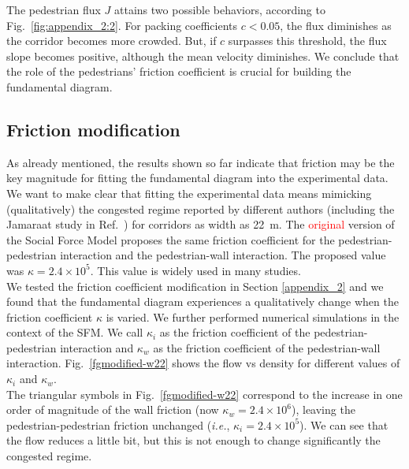 \documentclass[preprint,12pt]{elsarticle}
\begin{document}
The pedestrian flux $J$ attains two possible behaviors, according to 
Fig.~\ref{fig:appendix_2:2}. For packing coefficients $c<0.05$, the flux 
diminishes as the corridor becomes more crowded. But, if $c$ surpasses this 
threshold, the flux slope becomes positive, although the mean velocity 
diminishes. We conclude that the role of the pedestrians' friction coefficient is crucial 
for building the fundamental diagram.   






\subsection{Friction modification}

As already mentioned, the results shown so far indicate that friction may be the 
key magnitude for fitting the fundamental diagram into the experimental data. We 
want to make clear that fitting the experimental data means mimicking 
(qualitatively) the congested regime reported by different authors (including 
the Jamaraat study in Ref.~\cite{helbing3}) for corridors as width as 22~m. The 
\textcolor{red}{original} version of the Social Force Model proposes the same 
friction coefficient for the pedestrian-pedestrian interaction and the 
pedestrian-wall interaction. The proposed value was $\kappa = 2.4\times10^{5}$. 
This value is widely used in many studies.  \\

We tested the friction coefficient modification in Section \ref{appendix_2} and we found that the fundamental diagram experiences a qualitatively change when the friction coefficient $\kappa$ is varied. We further performed numerical simulations in the context of the SFM. We call $\kappa_i$ as the friction coefficient of the pedestrian-pedestrian interaction and $\kappa_w$ as the friction coefficient of the pedestrian-wall interaction. Fig.~\ref{fgmodified-w22} shows the flow vs density for different values of $\kappa_i$ and $\kappa_w$.\\

The triangular symbols in Fig.~\ref{fgmodified-w22} correspond to the increase in one order of magnitude of the wall friction (now $\kappa_w = 2.4\times10^{6}$), leaving the pedestrian-pedestrian friction unchanged (\textit{i.e.}, $\kappa_i = 2.4\times10^{5}$). We can see that the flow reduces a little bit, but this is not enough to change significantly the congested regime. \\
\end{document}
